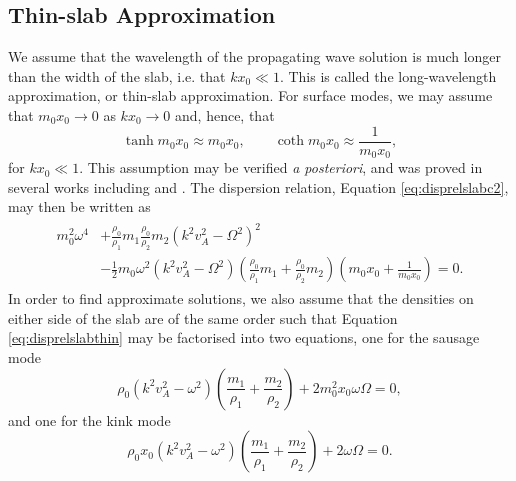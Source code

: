\subsection{Thin-slab Approximation}
\label{subsec:thin}

We assume that the wavelength of the propagating wave solution is much longer than the width of the slab, i.e. that $k x_0 \ll 1$.
This is called the long-wavelength approximation, or thin-slab approximation.
For surface modes, we may assume that $m_0 x_0 \to 0$ as $k x_0 \to 0$ and, hence, that
\begin{equation}
\tanh m_0 x_0 \approx m_0 x_0, \qquad \coth m_0 x_0 \approx \frac{1}{m_0 x_0},
\end{equation}
for $k x_0 \ll 1$.
This assumption may be verified \emph{a posteriori}, and was proved in several works including \cite{Roberts1981b} and \cite{Allcock2017}.
The dispersion relation, Equation \eqref{eq:disprelslabc2}, may then be written as
\begin{align}
\label{eq:disprelslabthin}
\begin{split}
m_0^2 \omega^4 
& + \frac{\rho_0}{\rho_1} m_1 \frac{\rho_0}{\rho_2} m_2 ( k^2 v_A^2 - \Omega^2 )^2 
\\[0.3cm]
& - \frac{1}{2} m_0 \omega^2
(k^2 v_A^2 - \Omega^2)
\left( \frac{\rho_0}{\rho_1} m_1 + \frac{\rho_0}{\rho_2} m_2 \right)
\left( m_0 x_0 + \frac{1}{m_0 x_0} \right)
= 0.
\end{split}
\end{align}
In order to find approximate solutions, we also assume that the densities on either side of the slab are of the same order such that Equation \eqref{eq:disprelslabthin} may be factorised into two equations, one for the sausage mode
%
\begin{equation}
\label{eq:disprelslabthinsaus}
\rho_0 (k^2 v_A^2 - \omega^2) \left( \frac{m_1}{\rho_1} + \frac{m_2}{\rho_2} \right)
+ 2 m_0^2 x_0 \omega \Omega = 0,
\end{equation}
%
and one for the kink mode
%
\begin{equation}
\label{eq:disprelslabthinkink}
\rho_0 x_0 (k^2 v_A^2 - \omega^2) \left( \frac{m_1}{\rho_1} + \frac{m_2}{\rho_2} \right)
+ 2 \omega \Omega = 0.
\end{equation}
%

